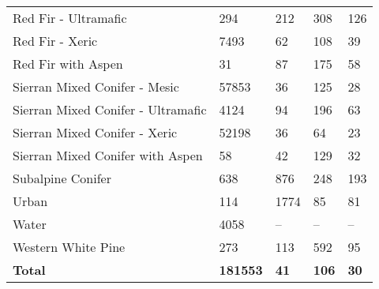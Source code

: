 \begin{table}[!htbp]
\begin{tabular}{@{}lllll@{}}
Red Fir - Ultramafic   			& 294      & 212       & 308      & 126 \\
Red Fir - Xeric        			& 7493     & 62        & 108      & 39  \\
Red Fir with Aspen     			& 31       & 87        & 175      & 58  \\
Sierran Mixed Conifer - Mesic  		& 57853    & 36        & 125      & 28  \\
Sierran Mixed Conifer - Ultramafic  & 4124     & 94        & 196      & 63     \\
Sierran Mixed Conifer - Xeric   	& 52198    & 36        & 64       & 23 \\
Sierran Mixed Conifer with Aspen  	& 58       & 42        & 129      & 32   \\
Subalpine Conifer   			 & 638      & 876       & 248      & 193      \\
Urban 							 & 114      & 1774      & 85       & 81       \\
Water 							 & 4058     & --       & --      & --      \\
Western White Pine    			 & 273      & 113       & 592      & 95       \\
\textbf{Total}       			& \textbf{181553}    & \textbf{41}   & \textbf{106}   & \textbf{30}                                                                                \\ \bottomrule
\end{tabular}
\end{table}


